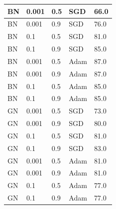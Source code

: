 \documentclass[conference]{IEEEtran}
\begin{document}
\begin{table}[htb]
\begin{tabular}{|p{}|p{}|p{}|p{}|p{}|}
\rule[-4mm]{0mm}{1cm} {BN} & \centerline{0.001} & \centerline{0.5} & \centerline{SGD} & \centerline{66.0}\\\hline
\rule[-4mm]{0mm}{1cm} {BN} & \centerline{0.001} & \centerline{0.9} & \centerline{SGD} & \centerline{76.0}\\\hline
\rule[-4mm]{0mm}{1cm} {BN} & \centerline{0.1} & \centerline{0.5} & \centerline{SGD} & \centerline{81.0}\\\hline
\rule[-4mm]{0mm}{1cm} {BN} & \centerline{0.1} & \centerline{0.9} & \centerline{SGD} & \centerline{85.0}\\\hline
\rule[-4mm]{0mm}{1cm} {BN} & \centerline{0.001} & \centerline{0.5} & \centerline{Adam} & \centerline{87.0}\\\hline
\rule[-4mm]{0mm}{1cm} {BN} & \centerline{0.001} & \centerline{0.9} & \centerline{Adam} & \centerline{87.0}\\\hline
\rule[-4mm]{0mm}{1cm} {BN} & \centerline{0.1} & \centerline{0.5} & \centerline{Adam} & \centerline{85.0}\\\hline
\rule[-4mm]{0mm}{1cm} {BN} & \centerline{0.1} & \centerline{0.9} & \centerline{Adam} & \centerline{85.0}\\\hline
\rule[-4mm]{0mm}{1cm} {GN} & \centerline{0.001} & \centerline{0.5} & \centerline{SGD} & \centerline{73.0}\\\hline
\rule[-4mm]{0mm}{1cm} {GN} & \centerline{0.001} & \centerline{0.9} & \centerline{SGD} & \centerline{80.0}\\\hline
\rule[-4mm]{0mm}{1cm} {GN} & \centerline{0.1} & \centerline{0.5} & \centerline{SGD} & \centerline{81.0}\\\hline
\rule[-4mm]{0mm}{1cm} {GN} & \centerline{0.1} & \centerline{0.9} & \centerline{SGD} & \centerline{83.0}\\\hline
\rule[-4mm]{0mm}{1cm} {GN} & \centerline{0.001} & \centerline{0.5} & \centerline{Adam} & \centerline{81.0}\\\hline
\rule[-4mm]{0mm}{1cm} {GN} & \centerline{0.001} & \centerline{0.9} & \centerline{Adam} & \centerline{81.0}\\\hline
\rule[-4mm]{0mm}{1cm} {GN} & \centerline{0.1} & \centerline{0.5} & \centerline{Adam} & \centerline{77.0}\\\hline
\rule[-4mm]{0mm}{1cm} {GN} & \centerline{0.1} & \centerline{0.9} & \centerline{Adam} & \centerline{77.0}\\\hline
\end{tabular}
\label{tab:1}
\end{table}
\end{document}
